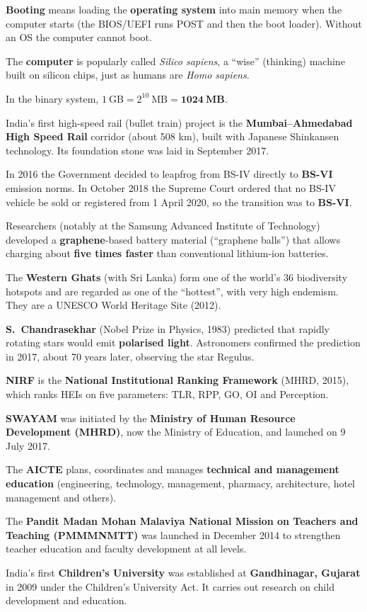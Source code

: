 \textbf{Booting} means loading the \textbf{operating system} into main memory when the computer starts (the BIOS/UEFI runs POST and then the boot loader). Without an OS the computer cannot boot.

The \textbf{computer} is popularly called \emph{Silico sapiens}, a ``wise'' (thinking) machine built on silicon chips, just as humans are \emph{Homo sapiens}.

In the binary system, $1\ \text{GB}=2^{10}\ \text{MB}=\mathbf{1024\ MB}$.

India's first high-speed rail (bullet train) project is the \textbf{Mumbai--Ahmedabad High Speed Rail} corridor (about 508 km), built with Japanese Shinkansen technology. Its foundation stone was laid in September 2017.

In 2016 the Government decided to leapfrog from BS-IV directly to \textbf{BS-VI} emission norms. In October 2018 the Supreme Court ordered that no BS-IV vehicle be sold or registered from 1 April 2020, so the transition was to \textbf{BS-VI}.

Researchers (notably at the Samsung Advanced Institute of Technology) developed a \textbf{graphene}-based battery material (``graphene balls'') that allows charging about \textbf{five times faster} than conventional lithium-ion batteries.

The \textbf{Western Ghats} (with Sri Lanka) form one of the world's 36 biodiversity hotspots and are regarded as one of the ``hottest'', with very high endemism. They are a UNESCO World Heritage Site (2012).

\textbf{S.~Chandrasekhar} (Nobel Prize in Physics, 1983) predicted that rapidly rotating stars would emit \textbf{polarised light}. Astronomers confirmed the prediction in 2017, about 70 years later, observing the star Regulus.

\textbf{NIRF} is the \textbf{National Institutional Ranking Framework} (MHRD, 2015), which ranks HEIs on five parameters: TLR, RPP, GO, OI and Perception.

\textbf{SWAYAM} was initiated by the \textbf{Ministry of Human Resource Development (MHRD)}, now the Ministry of Education, and launched on 9 July 2017.

The \textbf{AICTE} plans, coordinates and manages \textbf{technical and management education} (engineering, technology, management, pharmacy, architecture, hotel management and others).

The \textbf{Pandit Madan Mohan Malaviya National Mission on Teachers and Teaching (PMMMNMTT)} was launched in December 2014 to strengthen teacher education and faculty development at all levels.

India's first \textbf{Children's University} was established at \textbf{Gandhinagar, Gujarat} in 2009 under the Children's University Act. It carries out research on child development and education.

